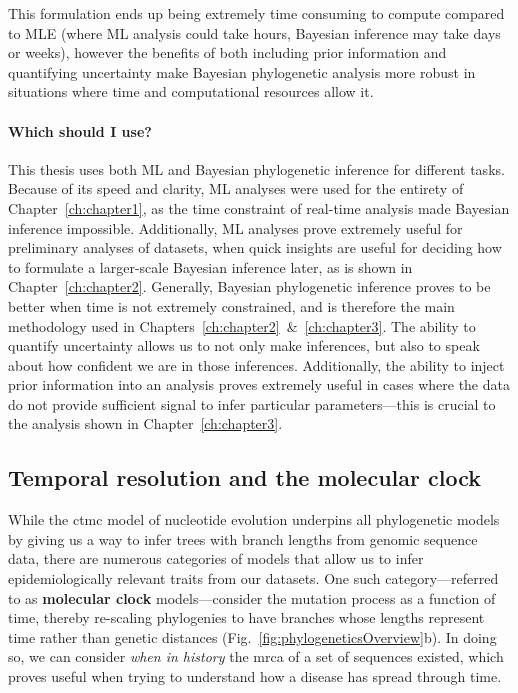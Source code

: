 This formulation ends up being extremely time consuming to compute compared to MLE (where ML analysis could take hours, Bayesian inference may take days or weeks), however the benefits of both including prior information and quantifying uncertainty make Bayesian phylogenetic analysis more robust in situations where time and computational resources allow it.

\paragraph*{Which should I use?}
This thesis uses both ML and Bayesian phylogenetic inference for different tasks.
Because of its speed and clarity, ML analyses were used for the entirety of Chapter~\ref{ch:chapter1}, as the time constraint of real-time analysis made Bayesian inference impossible.
Additionally, ML analyses prove extremely useful for preliminary analyses of datasets, when quick insights are useful for deciding how to formulate a larger-scale Bayesian inference later, as is shown in Chapter~\ref{ch:chapter2}.
Generally, Bayesian phylogenetic inference proves to be better when time is not extremely constrained, and is therefore the main methodology used in Chapters~\ref{ch:chapter2}~\&~\ref{ch:chapter3}.
The ability to quantify uncertainty allows us to not only make inferences, but also to speak about how confident we are in those inferences.
Additionally, the ability to inject prior information into an analysis proves extremely useful in cases where the data do not provide sufficient signal to infer particular parameters---this is crucial to the analysis shown in Chapter~\ref{ch:chapter3}.

\subsection{Temporal resolution and the molecular clock}\label{ssec:molClock}
While the \gls{ctmc} model of nucleotide evolution underpins all phylogenetic models by giving us a way to infer trees with branch lengths from genomic sequence data, there are numerous categories of models that allow us to infer epidemiologically relevant traits from our datasets.
One such category---referred to as \textbf{molecular clock} models---consider the mutation process as a function of time, thereby re-scaling phylogenies to have branches whose lengths represent time rather than genetic distances (Fig.~\ref{fig:phylogeneticsOverview}b).
In doing so, we can consider \textit{when in history} the \gls{mrca} of a set of sequences existed, which proves useful when trying to understand how a disease has spread through time.

